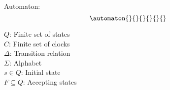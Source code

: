 \begin{definition}\label{definition:automatonDefinition}
    \cite*{Eugene2001}
    Automaton:
    $$\automaton{}{}{}{}{}{}$$

    $Q$: Finite set of states \\
    $C$: Finite set of clocks \\
    $\Delta$: Transition relation \\
    $\Sigma$: Alphabet \\
    $s\in Q$: Initial state \\
    $F\subseteq Q$: Accepting states
\end{definition}
